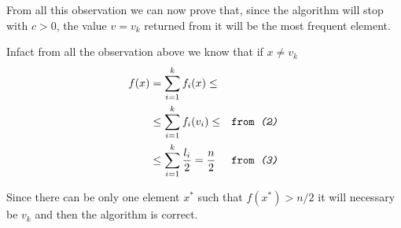 \documentclass[a4paper]{article}
\begin{document}
\noindent
From all this observation we can now prove that, since the algorithm will stop with $c>0$, the value $v = v_k$ returned from it will be the most frequent element.

\noindent
Infact from all the observation above we know that if $x \neq v_k$
\begin{align*}
f(x) &= \sum_{i=1}^k f_i(x) \leq \\
&\leq \sum_{i=1}^{k} f_i(v_i) \leq &\texttt{from \textit{(2)}}\\
&\leq \sum_{i=1}^{k} \frac{l_i}{2} = \frac{n}{2}  &\texttt{from \textit{(3)}}
\end{align*}

Since there can be only one element $x^*$ such that $f(x^*) > n/2$ it will necessary be $v_k$ and then the algorithm is correct.
\end{document}
